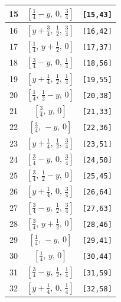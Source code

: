 \documentclass[fleqn,8pt]{jsarticle}
\begin{document}
\begin{longtable}{ccc}
15 & $\left[ \frac{1}{4} - y,\, 0,\, \frac{3}{4} \right]$ & {\tt [15,43]} \\ \hline
16 & $\left[ y + \frac{3}{4},\, \frac{1}{2},\, \frac{3}{4} \right]$ & {\tt [16,42]} \\ \hline
17 & $\left[ \frac{1}{4},\, y + \frac{1}{2},\, 0 \right]$ & {\tt [17,37]} \\ \hline
18 & $\left[ \frac{3}{4} - y,\, 0,\, \frac{1}{4} \right]$ & {\tt [18,56]} \\ \hline
19 & $\left[ y + \frac{1}{4},\, \frac{1}{2},\, \frac{1}{4} \right]$ & {\tt [19,55]} \\ \hline
20 & $\left[ \frac{1}{4},\, \frac{1}{2} - y,\, 0 \right]$ & {\tt [20,38]} \\ \hline
21 & $\left[ \frac{3}{4},\, y,\, 0 \right]$ & {\tt [21,33]} \\ \hline
22 & $\left[ \frac{3}{4},\, - y,\, 0 \right]$ & {\tt [22,36]} \\ \hline
23 & $\left[ y + \frac{1}{4},\, \frac{1}{2},\, \frac{3}{4} \right]$ & {\tt [23,51]} \\ \hline
24 & $\left[ \frac{3}{4} - y,\, 0,\, \frac{3}{4} \right]$ & {\tt [24,50]} \\ \hline
25 & $\left[ \frac{3}{4},\, \frac{1}{2} - y,\, 0 \right]$ & {\tt [25,45]} \\ \hline
26 & $\left[ y + \frac{1}{4},\, 0,\, \frac{3}{4} \right]$ & {\tt [26,64]} \\ \hline
27 & $\left[ \frac{3}{4} - y,\, \frac{1}{2},\, \frac{3}{4} \right]$ & {\tt [27,63]} \\ \hline
28 & $\left[ \frac{3}{4},\, y + \frac{1}{2},\, 0 \right]$ & {\tt [28,46]} \\ \hline
29 & $\left[ \frac{1}{4},\, - y,\, 0 \right]$ & {\tt [29,41]} \\ \hline
30 & $\left[ \frac{1}{4},\, y,\, 0 \right]$ & {\tt [30,44]} \\ \hline
31 & $\left[ \frac{3}{4} - y,\, \frac{1}{2},\, \frac{1}{4} \right]$ & {\tt [31,59]} \\ \hline
32 & $\left[ y + \frac{1}{4},\, 0,\, \frac{1}{4} \right]$ & {\tt [32,58]} \\
\end{longtable}
\renewcommand{\arraystretch}{1.2}
\end{document}
